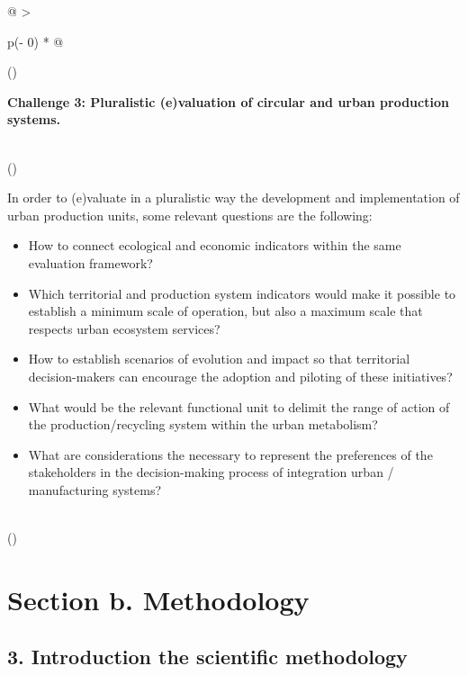 \documentclass[
  11pt,
  a4paperpaper,
  onecolumn]{article}
\begin{document}
\begin{longtable}[]{@{}
  >{\raggedright\arraybackslash}p{(\columnwidth - 0\tabcolsep) * }@{}}
\toprule()
\begin{minipage}[b]{\linewidth}\raggedright
\textbf{Challenge 3: Pluralistic (e)valuation of circular and urban
production systems.}
\end{minipage} \\
\midrule()
\endhead
\begin{minipage}[t]{\linewidth}\raggedright
In order to (e)valuate in a pluralistic way the development and
implementation of urban production units, some relevant questions are
the following:

\begin{itemize}
\item
  How to connect ecological and economic indicators within the same
  evaluation framework?
\item
  Which territorial and production system indicators would make it
  possible to establish a minimum scale of operation, but also a maximum
  scale that respects urban ecosystem services?
\item
  How to establish scenarios of evolution and impact so that territorial
  decision-makers can encourage the adoption and piloting of these
  initiatives?
\item
  What would be the relevant functional unit to delimit the range of
  action of the production/recycling system within the urban metabolism?
\item
  What are considerations the necessary to represent the preferences of
  the stakeholders in the decision-making process of integration urban /
  manufacturing systems?
\end{itemize}
\end{minipage} \\
\bottomrule()
\end{longtable}

\normalsize

\hypertarget{section-b.-methodology}{%
\section{Section b. Methodology}\label{section-b.-methodology}}

\hypertarget{introduction-the-scientific-methodology}{%
\subsection{3. Introduction the scientific
methodology}\label{introduction-the-scientific-methodology}}
\end{document}
